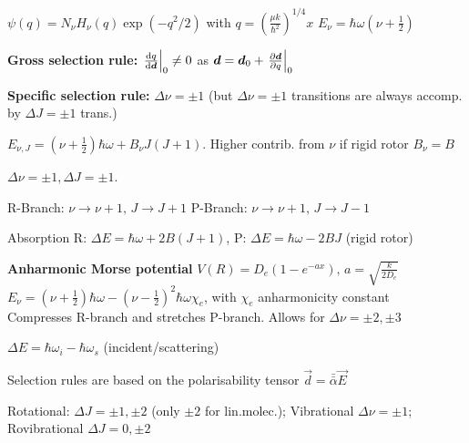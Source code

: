\begin{squishlist}
    \item $\psi(q) = N_{\nu} H_{\nu}(q) \exp(-q^2/2)$ with $q = \left(\frac{\mu k}{\hbar^2}\right)^{1/4}x$ \squishsep $E_{\nu} = \hbar \omega (\nu + \frac{1}{2})$
    \item \textbf{Gross selection rule:} $\left.\der{\vec{d}}{q}\right|_0 \neq 0$ \quad as $\vec{d} = \vec{d}_0 + \left. \D{q}{\vec{d}}\right|_0$
    \item \textbf{Specific selection rule:} $\Delta \nu = \pm 1$ (but $\Delta \nu = \pm 1$ transitions are always accomp. by $\Delta J = \pm 1$ trans.)
\end{squishlist}

\begin{squishlist}
    \item $E_{\nu, J} = (\nu + \frac{1}{2}) \hbar \omega + B_{\nu} J(J+1)$. Higher contrib. from $\nu$ \squishsep if rigid rotor $B_{\nu} = B$
    \item $\Delta \nu = \pm 1, \Delta J = \pm 1$.
    \item R-Branch: $\nu \rightarrow \nu + 1,\, J \rightarrow J+1$ \quad P-Branch:  $\nu \rightarrow \nu + 1, \,  J \rightarrow J-1$
    \item Absorption \quad R: $\Delta E = \hbar \omega + 2B(J+1)$, P: $\Delta E = \hbar \omega - 2BJ$ (rigid rotor)
    \item \textbf{Anharmonic Morse potential} $V(R) = D_e (1 - e^{-ax}), \, a = \sqrt{\frac{k}{2D_e}}$ \\
    $E_{\nu} = (\nu+\frac{1}{2}) \hbar \omega - (\nu - \frac{1}{2})^2 \hbar \omega \chi_e$, with $\chi_e$ anharmonicity constant \\
    Compresses R-branch and stretches P-branch. Allows for $\Delta \nu = \pm 2, \pm 3$
\end{squishlist}

\begin{squishlist}
    \item $\Delta E = \hbar \omega_i - \hbar \omega_s$ (incident/scattering)
    \item Selection rules are based on the polarisability tensor $\vec{d} = \bar{\bar{\alpha}} \vec{E}$
    \item Rotational: $\Delta J = \pm 1, \pm 2$ (only $\pm 2$ for lin.molec.); Vibrational $\Delta \nu  =\pm 1$; \\ Rovibrational $\Delta J = 0, \pm 2$
\end{squishlist}

